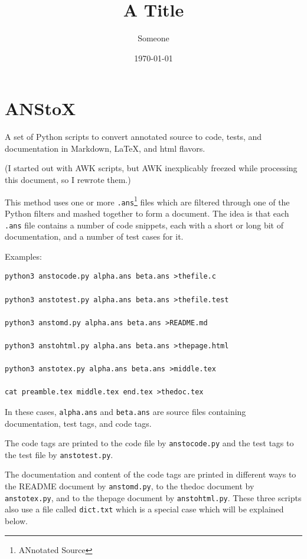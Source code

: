 \documentclass{report}
\title{A Title}
\author{Someone}
\date{\today}
\begin{document}
\maketitle

\tableofcontents


\part{ANStoX}
\label{anstox}

A set of Python scripts to convert annotated source to code, tests, and documentation in Markdown, \LaTeX{}, and html flavors.

(I started out with AWK scripts, but AWK inexplicably freezed while processing this document, so I rewrote them.)

This method uses one or more \texttt{.ans}\footnote{ANnotated Source} files which are filtered through one of the Python filters and mashed together to form a document. The idea is that each \texttt{.ans} file contains a number of code snippets, each with a short or long bit of documentation, and a number of test cases for it.

Examples:

\begin{verbatim}
python3 anstocode.py alpha.ans beta.ans >thefile.c

python3 anstotest.py alpha.ans beta.ans >thefile.test

python3 anstomd.py alpha.ans beta.ans >README.md

python3 anstohtml.py alpha.ans beta.ans >thepage.html

python3 anstotex.py alpha.ans beta.ans >middle.tex

cat preamble.tex middle.tex end.tex >thedoc.tex
\end{verbatim}

In these cases, \texttt{alpha.ans} and \texttt{beta.ans} are source files containing documentation, test tags, and code tags.

The code tags are printed to the code file by \texttt{anstocode.py} and the test tags to the test file by \texttt{anstotest.py}.

The documentation and content of the code tags are printed in different ways to the README document by \texttt{anstomd.py}, to the thedoc document by \texttt{anstotex.py}, and to the thepage document by \texttt{anstohtml.py}. These three scripts also use a file called \texttt{dict.txt} which is a special case which will be explained below.
\end{document}
